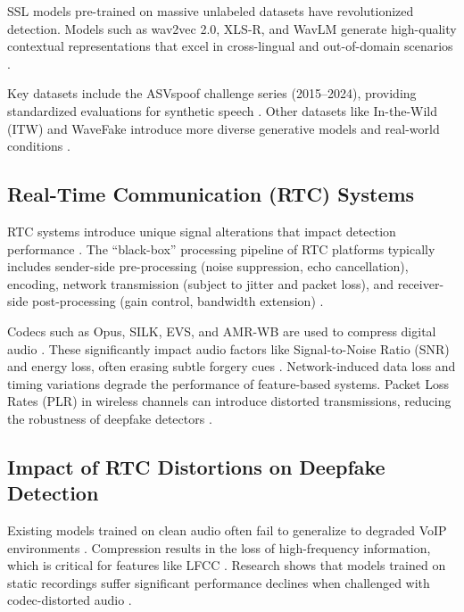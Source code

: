 SSL models pre-trained on massive unlabeled datasets have revolutionized detection. Models such as wav2vec 2.0, XLS-R, and WavLM generate high-quality contextual representations that excel in cross-lingual and out-of-domain scenarios \cite{Pianese2022, Li2024_survey, ZhangB2025}.

Key datasets include the ASVspoof challenge series (2015–2024), providing standardized evaluations for synthetic speech \cite{Yamagishi2021, Wang2024_asv5, Li2024_survey}. Other datasets like In-the-Wild (ITW) and WaveFake introduce more diverse generative models and real-world conditions \cite{Li2024_survey, ZhangB2025}.

\subsection{Real-Time Communication (RTC) Systems}

RTC systems introduce unique signal alterations that impact detection performance \cite{Mathew2024, Xue2025_RTCFake}. The ``black-box'' processing pipeline of RTC platforms typically includes sender-side pre-processing (noise suppression, echo cancellation), encoding, network transmission (subject to jitter and packet loss), and receiver-side post-processing (gain control, bandwidth extension) \cite{Xue2025_RTCFake}.

Codecs such as Opus, SILK, EVS, and AMR-WB are used to compress digital audio \cite{Xue2025_RTCFake, Shi2024}. These significantly impact audio factors like Signal-to-Noise Ratio (SNR) and energy loss, often erasing subtle forgery cues \cite{Pham2024, Shi2024}. Network-induced data loss and timing variations degrade the performance of feature-based systems. Packet Loss Rates (PLR) in wireless channels can introduce distorted transmissions, reducing the robustness of deepfake detectors \cite{Shi2024}.

\subsection{Impact of RTC Distortions on Deepfake Detection}

Existing models trained on clean audio often fail to generalize to degraded VoIP environments \cite{Mathew2024, Shi2024}. Compression results in the loss of high-frequency information, which is critical for features like LFCC \cite{Li2024_survey, Shi2024}. Research shows that models trained on static recordings suffer significant performance declines when challenged with codec-distorted audio \cite{Mathew2024, Shi2024}.

